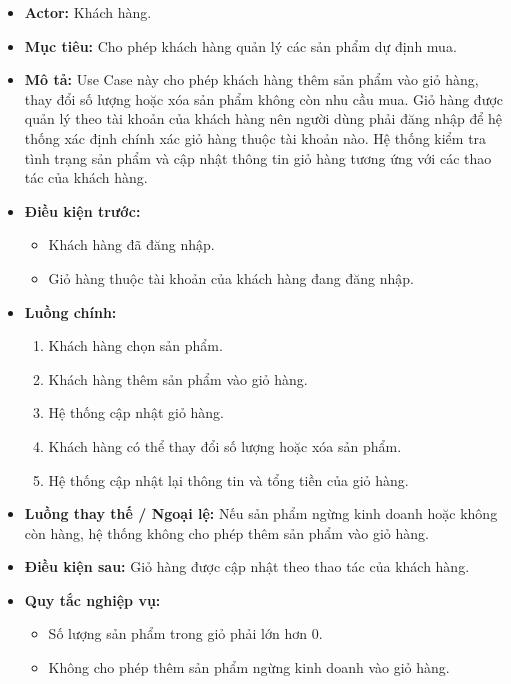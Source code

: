 \documentclass[12pt,a4paper]{article}
\begin{document}
\begin{itemize}

 \item \textbf{Actor:} Khách hàng.

 \item \textbf{Mục tiêu:} Cho phép khách hàng quản lý các sản phẩm dự định mua.

 \item \textbf{Mô tả:} Use Case này cho phép khách hàng thêm sản phẩm vào giỏ hàng, thay đổi số lượng hoặc xóa sản phẩm không còn nhu cầu mua. Giỏ hàng được quản lý theo tài khoản của khách hàng nên người dùng phải đăng nhập để hệ thống xác định chính xác giỏ hàng thuộc tài khoản nào. Hệ thống kiểm tra tình trạng sản phẩm và cập nhật thông tin giỏ hàng tương ứng với các thao tác của khách hàng.

 \item \textbf{Điều kiện trước:}
    \begin{itemize}
        \item Khách hàng đã đăng nhập.
        \item Giỏ hàng thuộc tài khoản của khách hàng đang đăng nhập.
    \end{itemize}

 \item \textbf{Luồng chính:}

 \begin{enumerate}

  \item Khách hàng chọn sản phẩm.

  \item Khách hàng thêm sản phẩm vào giỏ hàng.

  \item Hệ thống cập nhật giỏ hàng.

  \item Khách hàng có thể thay đổi số lượng hoặc xóa sản phẩm.

  \item Hệ thống cập nhật lại thông tin và tổng tiền của giỏ hàng.

 \end{enumerate}

 \item \textbf{Luồng thay thế / Ngoại lệ:} Nếu sản phẩm ngừng kinh doanh hoặc không còn hàng, hệ thống không cho phép thêm sản phẩm vào giỏ hàng.

 \item \textbf{Điều kiện sau:} Giỏ hàng được cập nhật theo thao tác của khách hàng.

 \item \textbf{Quy tắc nghiệp vụ:}

 \begin{itemize}

  \item Số lượng sản phẩm trong giỏ phải lớn hơn 0.

  \item Không cho phép thêm sản phẩm ngừng kinh doanh vào giỏ hàng.

 \end{itemize}

\end{itemize}
\end{document}
